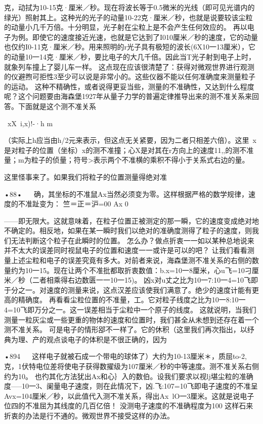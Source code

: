 克，动拭为10-15克·厘米／秒。现在将波长等于0.5微米的光线（即可见光谱内的绿光）照射其上。这种光的光子的动量10-22克·厘米／秒，也就是说要较该尘粒的动量小几千万倍。十分明显，光子射在尘粒上是不会产生任何效应的。
再以电子为例。即使它的速度接近光速，也就是它达到了I010厘米／秒的速度，它的动量也仅约I0-11克·厘米／秒。用来照明的r光子具有极短的波长(6X10一13厘米），它的动量10一14克·厘米／秒，要比电子的大几千倍。因此当T光子射到电子上时，就象列车撞上了婴儿车一样。
这点现在应该很清楚了：获得对微观世界进行观测的仪避煦可拒性3至少可以说是非常小的。这些仪器不能以任何准确度来测量粒子的运动。
这种不精确性，或者说得更妥当些，测量的不准确性，又达到什么程度呢？这个问题要由海森堡1927年从量子力学的普遍定律推导出来的测不准关系来回答。下面就是这个测不准关系

~xX~i,x)!-·h
m

（实际上h应当由h/2元来表示，但这点无关紧要，因为二者只相差六倍）。这里~x是对粒子的位置（坐标）x的测不准撞；心X是对其在r方向上的速度11,,的测不准量；m为粒子的侦量；符号>表示两个不准横的乘积不得小于关系式右边的量。

这里怪事来了。如果我们将粒子的位置测量得绝对准

•88•
  
确，其坐标的不准鼠Ax当然必须变为零。这样根据严格的数学规律，速度的不准趾变为：
竺＝正＝沪=00
	Ax	0

——即无限大。这就意味着，在粒子位置正被测定的那一瞬，它的速度变成绝对地不确定的。相反地，如果在某一瞬时我们以绝对的准确度测得了粒子的速度，则我们无法判断这个粒子在此瞬时的位置。
怎么办？做点折衷一一如以某种总地说来并不太大的误差同时视鼠电子的位置和速度一一或许是可以的吧？
让我们看看测量上述尘粒和电子的误差究竟有多大。对前者来说，海森堡测不准关系的右侧的数量约为10一15。现在让两个不准批都取折衷数值：b.x=10一8厘米，心u飞=10刁厘米／秒（二者相乘得右边数匮一一10一15)。
凶x对u丈之比为10一7:10一4=10飞即于分之一。对速度的测量来说，这点汉差应该使我们满意了。绝少的速度计能有更高的精确度。
再看看尘粒位置的不准量，工。它对粒子线度之比为10一8:10一4=10飞即万分之一。这一误差相当于尘粒中一个原子的线度。
这就说明，当我们测量一粒灰尘或一些更重的物体的速度和位置时，我们甚全从未想到还存在着一个测不准关系。
可是电子的情形郘不一样了。它的休积（这里我们再次指出，以纾典为理、产的观点谈电子的体积是不很正确的，因为

•894
  
这样电子就被石成一个带电的球体了）大约为10-13厘米＊，质屈to-2,克，1伏特电位差将使电子获得数擢级为107厘米／秒的中等速度。测不准关系右侧约为10。
也彴其化方法犹出Ax和心｝入的数伯。设我们要求以视lj堪尘粒的准确度—--10一3、阑量电子速度，则在此情况下，凶.飞:107=10飞即电子速度的不准呈Avx=104厘米／秒，以此值代入测不准关系，得出Ax~lO一3厘米。这就是说电子位四的不准屈为其线度的几百亿倍！
没测电子速度的不准确程度为100%
这样石来折衷的办法是行不通的。微观世界不接受这样的办法。


